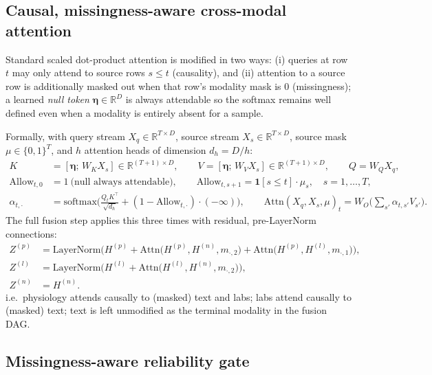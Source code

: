 \documentclass[11pt]{article}
\newcommand{\R}{\mathbb{R}}
\newcommand{\1}[1]{\mathbf{1}\!\left[#1\right]}
\begin{document}
\subsection{Causal, missingness-aware cross-modal attention}\label{sec:crossattn}

Standard scaled dot-product attention is modified in two ways: (i) queries at row $t$ may only attend to source rows $s\le t$ (causality), and (ii) attention to a source row is additionally masked out when that row's modality mask is $0$ (missingness); a learned \emph{null token} $\bm{\eta}\in\R^{D}$ is always attendable so the softmax remains well defined even when a modality is entirely absent for a sample.

Formally, with query stream $X_q\in\R^{T\times D}$, source stream $X_s \in \R^{T\times D}$, source mask $\mu \in \{0,1\}^T$, and $h$ attention heads of dimension $d_h=D/h$:
\begin{align}
K &= [\bm{\eta};\, W_K X_s] \in \R^{(T+1)\times D}, \qquad V = [\bm{\eta};\, W_V X_s] \in \R^{(T+1)\times D}, \qquad Q = W_Q X_q, \\
\mathrm{Allow}_{t,0} &= 1 \ \text{(null always attendable)}, \qquad \mathrm{Allow}_{t,s+1} = \1{s\le t}\cdot \mu_s, \quad s=1,\dots,T,\\
\alpha_{t,\cdot} &= \mathrm{softmax}\Big(\tfrac{Q_t K^\top}{\sqrt{d_h}} + (1-\mathrm{Allow}_{t,\cdot})\cdot(-\infty)\Big), \qquad
\mathrm{Attn}(X_q,X_s,\mu)_t = W_O\Big(\sum_{s'} \alpha_{t,s'} V_{s'}\Big).
\end{align}
The full fusion step applies this three times with residual, pre-LayerNorm connections:
\begin{align}
Z^{(p)} &= \mathrm{LayerNorm}\Big(H^{(p)} + \mathrm{Attn}\big(H^{(p)},H^{(n)},m_{\cdot,2}\big) + \mathrm{Attn}\big(H^{(p)},H^{(l)},m_{\cdot,1}\big)\Big), \\
Z^{(l)} &= \mathrm{LayerNorm}\Big(H^{(l)} + \mathrm{Attn}\big(H^{(l)},H^{(n)},m_{\cdot,2}\big)\Big),\\
Z^{(n)} &= H^{(n)}.
\end{align}
i.e.\ physiology attends causally to (masked) text and labs; labs attend causally to (masked) text; text is left unmodified as the terminal modality in the fusion DAG.

\subsection{Missingness-aware reliability gate}
\end{document}
